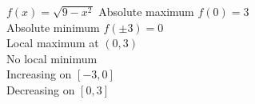 {$f(x) = \sqrt{9 - x^{2}}$}
{Absolute maximum $f(0) = 3$ \\
Absolute minimum $f(\pm 3) = 0$ \\
Local maximum at $(0, 3)$ \\
No local minimum\\
Increasing on $[-3, 0]$\\
Decreasing on $[0, 3]$
}